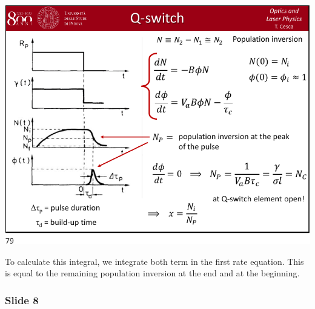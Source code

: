 \documentclass[../main/main.tex]{subfiles}
\begin{document}
\begin{minipage}[]{0.5\linewidth}
\centering
\includegraphics[page=7,width=1\textwidth]{../lessons/pdf_file/15_lecture.pdf}
\end{minipage}
\hspace{0.3cm}\vspace{0.3cm}
\begin{minipage}[c]{0.47\linewidth}

To calculate this integral, we integrate both term in the first rate equation. This is equal to the remaining population inversion at the end and at the beginning.

\end{minipage}

\subsubsection*{Slide 8}
\end{document}
